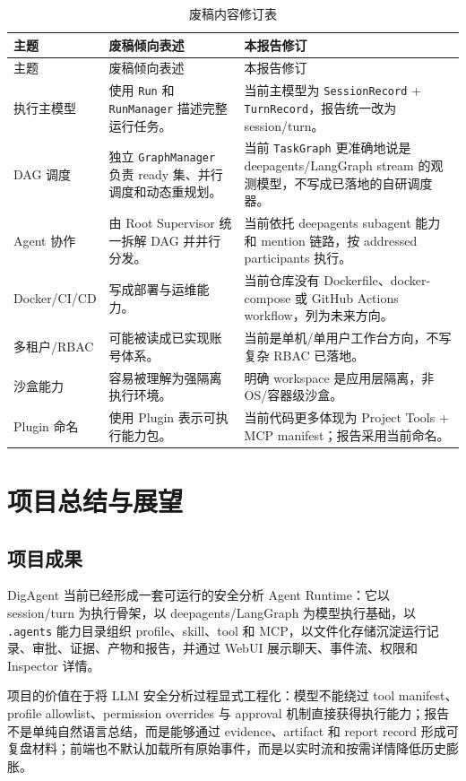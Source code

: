 \documentclass[UTF8,zihao=-4,a4paper,fontset=none]{ctexart}
\newcommand{\code}[1]{\texttt{\footnotesize #1}}
\begin{document}
\begin{longtable}{L{0.28\textwidth}L{0.30\textwidth}L{0.32\textwidth}}
\caption{废稿内容修订表}\label{tab:corrections}\\
\toprule
主题 & 废稿倾向表述 & 本报告修订 \\
\midrule
\endfirsthead
\toprule
主题 & 废稿倾向表述 & 本报告修订 \\
\midrule
\endhead
执行主模型 & 使用 \code{Run} 和 \code{RunManager} 描述完整运行任务。 & 当前主模型为 \code{SessionRecord} + \code{TurnRecord}，报告统一改为 session/turn。 \\
DAG 调度 & 独立 \code{GraphManager} 负责 ready 集、并行调度和动态重规划。 & 当前 \code{TaskGraph} 更准确地说是 deepagents/LangGraph stream 的观测模型，不写成已落地的自研调度器。 \\
Agent 协作 & 由 Root Supervisor 统一拆解 DAG 并并行分发。 & 当前依托 deepagents subagent 能力和 mention 链路，按 addressed participants 执行。 \\
Docker/CI/CD & 写成部署与运维能力。 & 当前仓库没有 Dockerfile、docker-compose 或 GitHub Actions workflow，列为未来方向。 \\
多租户/RBAC & 可能被读成已实现账号体系。 & 当前是单机/单用户工作台方向，不写复杂 RBAC 已落地。 \\
沙盒能力 & 容易被理解为强隔离执行环境。 & 明确 workspace 是应用层隔离，非 OS/容器级沙盒。 \\
Plugin 命名 & 使用 Plugin 表示可执行能力包。 & 当前代码更多体现为 Project Tools + MCP manifest；报告采用当前命名。 \\
\bottomrule
\end{longtable}

\section{项目总结与展望}

\subsection{项目成果}

DigAgent 当前已经形成一套可运行的安全分析 Agent Runtime：它以 session/turn 为执行骨架，以 deepagents/LangGraph 为模型执行基础，以 \code{.agents} 能力目录组织 profile、skill、tool 和 MCP，以文件化存储沉淀运行记录、审批、证据、产物和报告，并通过 WebUI 展示聊天、事件流、权限和 Inspector 详情。

项目的价值在于将 LLM 安全分析过程显式工程化：模型不能绕过 tool manifest、profile allowlist、permission overrides 与 approval 机制直接获得执行能力；报告不是单纯自然语言总结，而是能够通过 evidence、artifact 和 report record 形成可复盘材料；前端也不默认加载所有原始事件，而是以实时流和按需详情降低历史膨胀。
\end{document}
